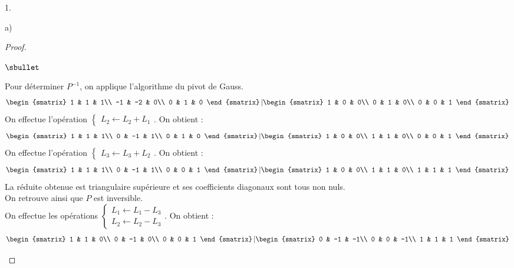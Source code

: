 \documentclass[11pt]{article}%
\begin{document}
\begin{noliste}{1.}
\begin{noliste}{a)}
\begin{proof}
\begin{noliste}{$\sbullet$}
	\item Pour déterminer $P^{-1}$, on applique l'algorithme du 
	pivot de Gauss.
	\[
	  \begin{smatrix}
	    1 & 1 & 1\\
	    -1 & -2 & 0\\
	    0 & 1 & 0
	  \end{smatrix}
	  \left\vert 
	  \begin{smatrix}
	    1 & 0 & 0\\
	    0 & 1 & 0\\
	    0 & 0 & 1
	  \end{smatrix}
	  \right.
	\]
	On effectue l'opération $\left\{
	\begin{array}{l}
	  L_2 \leftarrow L_2 + L_1
	\end{array}
	\right.$. On obtient :
	\[
	  \begin{smatrix}
	    1 & 1 & 1\\
	    0 & -1 & 1\\
	    0 & 1 & 0
	  \end{smatrix}
	  \left\vert 
	  \begin{smatrix}
	    1 & 0 & 0\\
	    1 & 1 & 0\\
	    0 & 0 & 1
	  \end{smatrix}
	  \right.
	\]
	On effectue l'opération $\left\{
	\begin{array}{l}
	  L_3 \leftarrow L_3 + L_2
	\end{array}
	\right.$. On obtient :
	\[
	  \begin{smatrix}
	    1 & 1 & 1\\
	    0 & -1 & 1\\
	    0 & 0 & 1
	  \end{smatrix}
	  \left\vert 
	  \begin{smatrix}
	    1 & 0 & 0\\
	    1 & 1 & 0\\
	    1 & 1 & 1
	  \end{smatrix}
	  \right.
	\]
	La réduite obtenue est triangulaire supérieure et ses 
	coefficients diagonaux sont tous non nuls.\\
	On retrouve ainsi que $P$ est inversible.\\
	On effectue les opérations $\left\{
	\begin{array}{l}
	  L_1 \leftarrow L_1 - L_3\\
	  L_2 \leftarrow L_2 - L_3
	\end{array}
	\right.$. On obtient :
	\[
	  \begin{smatrix}
	    1 & 1 & 0\\
	    0 & -1 & 0\\
	    0 & 0 & 1
	  \end{smatrix}
	  \left\vert 
	  \begin{smatrix}
	    0 & -1 & -1\\
	    0 & 0 & -1\\
	    1 & 1 & 1
	  \end{smatrix}
	  \right.
	\]
	

\end{noliste}
\end{proof}
\end{noliste}
\end{noliste}
\end{document}
